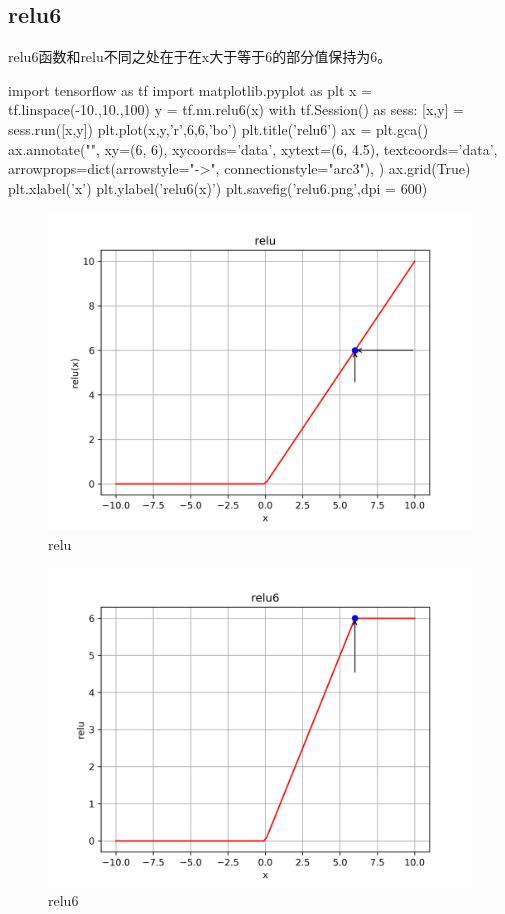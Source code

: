 \subsection{relu6}
relu6函数和relu不同之处在于在x大于等于6的部分值保持为6。
\begin{python}
import tensorflow as tf 
import matplotlib.pyplot as plt 
x = tf.linspace(-10.,10.,100)
y = tf.nn.relu6(x)
with tf.Session() as sess:
	[x,y] = sess.run([x,y])
plt.plot(x,y,'r',6,6,'bo')
plt.title('relu6')
ax = plt.gca()
ax.annotate("",
            xy=(6, 6), xycoords='data',
            xytext=(6, 4.5), textcoords='data',
            arrowprops=dict(arrowstyle="->",
                            connectionstyle="arc3"),
            )
ax.grid(True)
plt.xlabel('x')
plt.ylabel('relu6(x)')
plt.savefig('relu6.png',dpi = 600)
\end{python}
\begin{figure}[H]
\centering
\includegraphics[scale=0.8]{./pic/chapter1/relu.png}
\caption{relu}
\end{figure}
\begin{figure}[H]
\centering
\includegraphics[scale=0.8]{./pic/chapter1/relu6.png}
\caption{relu6}
\end{figure}

